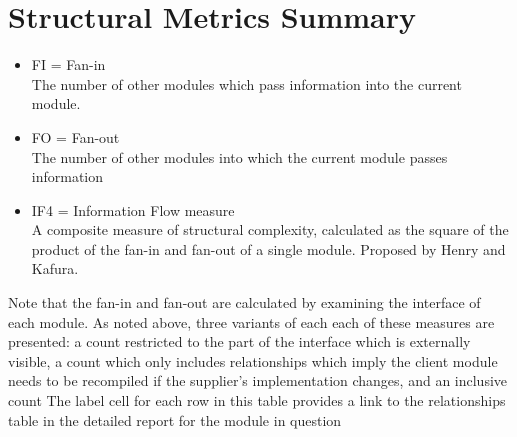 \section{Structural Metrics Summary}
\begin{itemize}
\item FI = Fan-in\\ 
 The number of other modules which pass information into the current module. 
\item FO = Fan-out\\ 
 The number of other modules into which the current module passes information 
\item IF4 = Information Flow measure\\ 
 A composite measure of structural complexity, calculated as the square of the product of the fan-in and fan-out of a single module.
Proposed by Henry and 
Kafura. 

\end{itemize}
 Note that the fan-in and fan-out are calculated by examining the interface of each module. As noted above, three variants of each each of
these measures are 
presented: a count restricted to the part of the interface which is externally visible, a count which only includes relationships which
imply the client module 
needs to be recompiled if the supplier's implementation changes, and an inclusive count The label cell for each row in this table provides a
link to the 
relationships table in the detailed report for the module in question 

